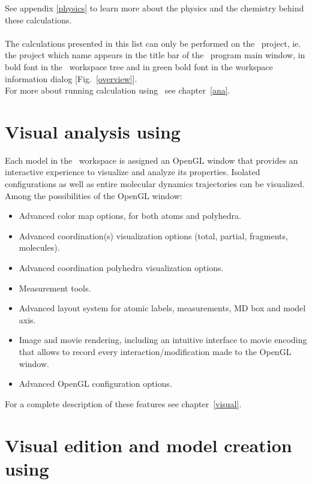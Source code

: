 See appendix \ref{physics} to learn more about the physics and the chemistry behind these calculations. \\
\\
The calculations presented in this list can only be performed on the \activp\ project, ie. the project which 
name appears in the title bar of the \atomes\ program main window, in bold font in the \atomes\ workspace tree and in green bold font in the workspace information dialog [Fig.~\ref{overview}]. \\
For more about running calculation using \atomes\ see chapter~\ref{ana}.

\clearpage

\section{Visual analysis using \atomes}
\label{visu}

Each model in the \atomes\ workspace is assigned an OpenGL window that provides an interactive experience to visualize and analyze its properties. 
Isolated configurations as well as entire molecular dynamics trajectories can be visualized. \\ 
Among the possibilities of the OpenGL window: 
\begin{itemize}
\item Advanced color map options, for both atoms and polyhedra. 
\item Advanced coordination(s) visualization options (total, partial, fragments, molecules). 
\item Advanced coordination polyhedra visualization options. 
\item Measurement tools.
\item Advanced layout system for atomic labels, measurements, MD box and model axis. 
\item Image and movie rendering, including an intuitive interface to movie encoding that allows to record every interaction/modification made to the OpenGL window. 
\item Advanced OpenGL configuration options.
\end{itemize}
For a complete description of these features see chapter~\ref{visual}. 

\section{Visual edition and model creation using \atomes}
\label{edit}

